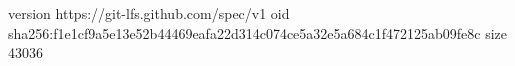 version https://git-lfs.github.com/spec/v1
oid sha256:f1e1cf9a5e13e52b44469eafa22d314c074ce5a32e5a684c1f472125ab09fe8c
size 43036
